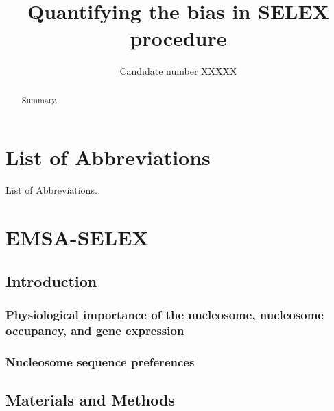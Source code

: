 \documentclass[parskip=full, numbers=noenddot]{scrreprt}
\title{Quantifying the bias in SELEX procedure}
\author{Candidate number XXXXX}
\begin{document}
\maketitle

\begin{abstract}
 
Summary.
 
\end{abstract}

\tableofcontents

\chapter*{List of Abbreviations}
\label{ch:abbrev}

List of Abbreviations.

\chapter{EMSA-SELEX}
\label{ch:emsaselex}

\section{Introduction}
\label{sec:emsaselex_intro}

\subsection{Physiological importance of the nucleosome, nucleosome occupancy, and gene expression}
\label{ssec:emsaselex_intro_importance}

\subsection{Nucleosome sequence preferences}
\label{ssec:emsaselex_intro_seqpref}

\subsection{}
\label{ssec:emsaselex_intro_why}

\section{Materials and Methods}
\label{sec:emsaselex_methods}
\end{document}
